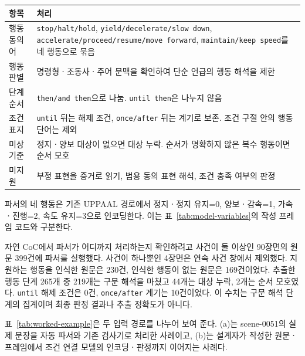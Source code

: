 \begin{revision}
\begin{table}[t]
\centering
\color{revisionblue}
\label{tab:parser-rules}
\footnotesize
\begin{tabularx}{\columnwidth}{L{.19\columnwidth}Y}
\toprule
항목 & 처리 \\
\midrule
행동 동의어 & \texttt{stop/halt/hold}, \texttt{yield/decelerate/slow down}, \texttt{accelerate/proceed/resume/move forward}, \texttt{maintain/keep speed}를 네 행동으로 묶음 \\
행동 판별 & 명령형ㆍ조동사ㆍ주어 문맥을 확인하여 단순 언급의 행동 해석을 제한 \\
단계 순서 & \texttt{then/and then}으로 나눔. \texttt{until then}은 나누지 않음 \\
조건 표지 & \texttt{until} 뒤는 해제 조건, \texttt{once/after} 뒤는 계기로 보존. 조건 구절 안의 행동 단어는 제외 \\
미상 기준 & 정지ㆍ양보 대상이 없으면 대상 누락. 순서가 명확하지 않은 복수 행동이면 순서 모호 \\
미지원 & 부정 표현을 증거로 읽기, 범용 동의 표현 해석, 조건 충족 여부의 판정 \\
\bottomrule
\end{tabularx}
\end{table}

파서의 네 행동은 기존 UPPAAL 경로에서 정지ㆍ정지 유지=0, 양보ㆍ감속=1, 가속ㆍ진행=2, 속도 유지=3으로 인코딩한다. 이는 표~\ref{tab:model-variables}의 작성 프레임 코드와 구분한다.

자연 CoC에서 파서가 어디까지 처리하는지 확인하려고 사건이 둘 이상인 90장면의 원문 399건에 파서를 실행했다. 사건이 하나뿐인 4장면은 연속 사건 창에서 제외했다. 지원하는 행동을 인식한 원문은 230건, 인식한 행동이 없는 원문은 169건이었다. 추출한 행동 단계 265개 중 219개는 구문 해석을 마쳤고 44개는 대상 누락, 2개는 순서 모호였다. \texttt{until} 해제 조건은 0건, \texttt{once/after} 계기는 10건이었다. 이 수치는 구문 해석 단계의 집계이며 최종 판정 결과나 추출 정확도가 아니다.

표~\ref{tab:worked-example}은 두 입력 경로를 나누어 보여 준다. (a)는 scene-0051의 실제 문장을 자동 파서와 기존 검사기로 처리한 사례이고, (b)는 설계자가 작성한 원문ㆍ프레임에서 조건 연결 모델의 인코딩ㆍ판정까지 이어지는 사례다.


\end{revision}
